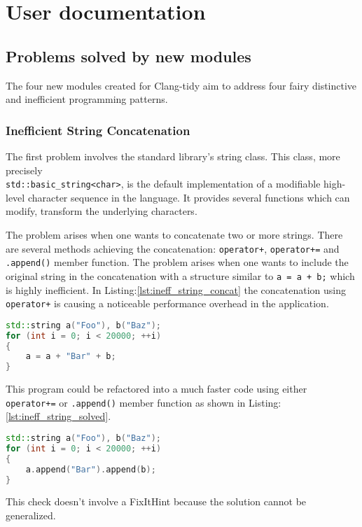 \section{User documentation}
\subsection{Problems solved by new modules}
\par The four new modules created for Clang-tidy aim to address four fairy distinctive and inefficient programming patterns. 
\subsubsection{Inefficient String Concatenation\cite{clang_tidy_string_concat}}
\par The first problem involves the standard library's string class. This class, more precisely \\\verb|std::basic_string<char>|, is the default implementation of a modifiable high-level character sequence in the language. It provides several functions which can modify, transform the underlying characters. \medskip
\par The problem arises when one wants to concatenate two or more strings. There are several methods achieving the concatenation: \verb|operator+|, \verb|operator+=| and \verb|.append()| member function. The problem arises when one wants to include the original string in the concatenation with a structure similar to \verb|a = a + b;| which is highly inefficient. In Listing:\ref{lst:ineff_string_concat} the concatenation using \verb|operator+| is causing a noticeable performance overhead in the application.  
\begin{lstlisting}[language=c++, frame=single ,caption={Highly inefficient code}, label={lst:ineff_string_concat}]
std::string a("Foo"), b("Baz");
for (int i = 0; i < 20000; ++i) 
{
	a = a + "Bar" + b;
}
\end{lstlisting}
\par This program could be refactored into a much faster code using either \verb|operator+=| or \verb|.append()| member function as shown in Listing:\ref{lst:ineff_string_solved}.
 \begin{lstlisting}[language=c++, frame=single ,caption={A more efficient version}, label={lst:ineff_string_solved}]
std::string a("Foo"), b("Baz");
for (int i = 0; i < 20000; ++i) 
{
	a.append("Bar").append(b);
}
 \end{lstlisting}
 \par This check doesn't involve a FixItHint because the solution cannot be generalized. 
